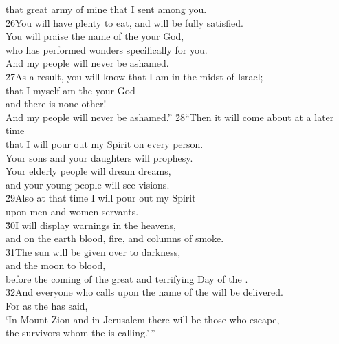 \begin{poetry}
\poemlll       that great army of mine that I sent among you. \\
\poeml \v{26}You will have plenty to eat, and will be fully satisfied. \\
\poemll    You will praise the name of the  your God, \\
\poeml who has performed wonders specifically for you. \\
\poemll    And my people will never be ashamed. \\
\poeml \v{27}As a result, you will know that I am in the midst of Israel; \\
\poemll    that I myself am the  your God--- \\
\poemlll       and there is none other! \\
\poeml And my people will never be ashamed.''
\poeml \v{28}``Then it will come about at a later time \\
\poemll    that I will pour out my Spirit on every person. \\
\poeml Your sons and your daughters will prophesy. \\
\poemll    Your elderly people will dream dreams, \\
\poemlll       and your young people will see visions. \\
\poeml \v{29}Also at that time I will pour out my Spirit \\
\poemll    upon men and women servants. \\
\poeml \v{30}I will display warnings in the heavens, \\
\poemll    and on the earth blood, fire, and columns of smoke. \\
\poeml \v{31}The sun will be given over to darkness, \\
\poemll    and the moon to blood, \\
\poemlll       before the coming of the great and terrifying Day of the . \\
\poeml \v{32}And everyone who calls upon the name of the  will be delivered. \\
\poemll    For as the  has said, \\
\poemlll       `In Mount Zion and in Jerusalem there will be those who escape, \\
\poemlll       the survivors whom the  is calling.'\,''
\end{poetry}

